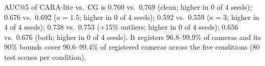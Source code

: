 AUC@5 of CARA-lite vs.\ CG is 0.760 vs.\ 0.769 (clean; higher in 0 of 4 seeds); 0.676 vs.\ 0.692 ($\kappa{=}1.5$; higher in 0 of 4 seeds); 0.592 vs.\ 0.559 ($\kappa{=}3$; higher in 4 of 4 seeds); 0.738 vs.\ 0.753 (+15\% outliers; higher in 0 of 4 seeds); 0.656 vs.\ 0.676 (both; higher in 0 of 4 seeds). It registers 96.8--99.9\% of cameras and its 90\% bounds cover 90.6--99.4\% of registered cameras across the five conditions (80 test scenes per condition).
